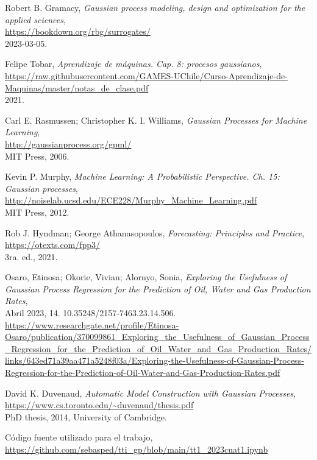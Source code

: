 \documentclass[a4paper]{article}
\begin{document}
\begin{thebibliography}{9}
	
	Robert B. Gramacy, \textit{Gaussian process modeling, design and optimization for the applied sciences},\\
	{\small \url{https://bookdown.org/rbg/surrogates/}}\\
	2023-03-05.
	
	Felipe Tobar, \textit{Aprendizaje de máquinas. Cap. 8: procesos gaussianos},\\
	{\small \url{https://raw.githubusercontent.com/GAMES-UChile/Curso-Aprendizaje-de-Maquinas/master/notas_de_clase.pdf}}\\
	2021.
	
	Carl E. Rasmussen; Christopher K. I. Williams, \textit{Gaussian Processes for Machine Learning},\\
	{\small \url{http://gaussianprocess.org/gpml/}}\\
	MIT Press, 2006.
	
	Kevin P. Murphy, \textit{Machine Learning: A Probabilistic Perspective. Ch. 15: Gaussian processes},\\
	{\small \url{http://noiselab.ucsd.edu/ECE228/Murphy_Machine_Learning.pdf}}\\
	MIT Press, 2012.
	
	Rob J. Hyndman; George Athanasopoulos, \textit{Forecasting: Principles and Practice},\\
	{\small \url{https://otexts.com/fpp3/}}\\
	3ra. ed., 2021.
	
	Osaro, Etinosa; Okorie, Vivian; Alornyo, Sonia, \textit{Exploring the Usefulness of Gaussian Process Regression for the Prediction of Oil, Water and Gas Production Rates},\\
	Abril 2023, 14. 10.35248/2157-7463.23.14.506.\\
	{\small \url{https://www.researchgate.net/profile/Etinosa-Osaro/publication/370099861_Exploring_the_Usefulness_of_Gaussian_Process_Regression_for_the_Prediction_of_Oil_Water_and_Gas_Production_Rates/links/643ed71a39aa471a5248f03a/Exploring-the-Usefulness-of-Gaussian-Process-Regression-for-the-Prediction-of-Oil-Water-and-Gas-Production-Rates.pdf}}
	
	David K. Duvenaud, \textit{Automatic Model Construction with Gaussian Processes},\\
	{\small \url{https://www.cs.toronto.edu/~duvenaud/thesis.pdf}}\\
	PhD thesis, 2014, University of Cambridge.
	
	Código fuente utilizado para el trabajo,\\
	{\small \url{https://github.com/sebasped/tti_gp/blob/main/tt1_2023cuat1.ipynb}}\\
	
\end{thebibliography}
\end{document}
